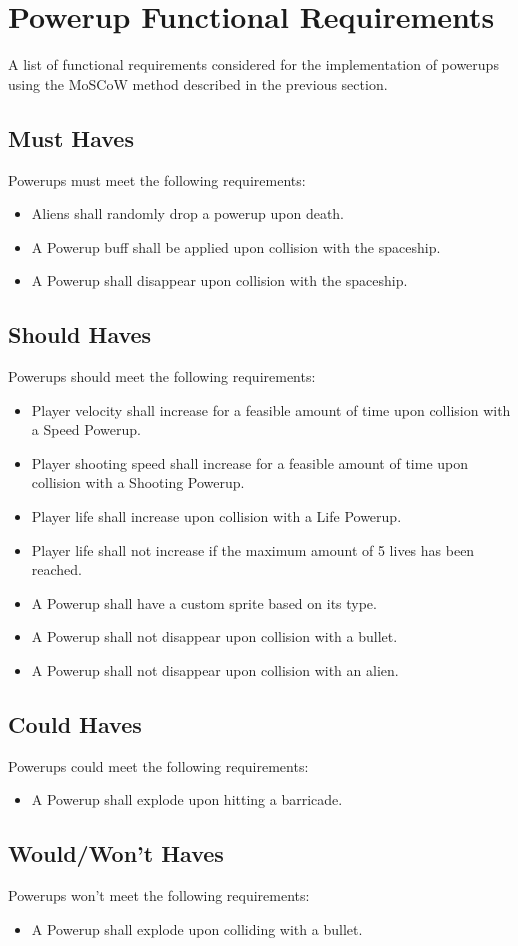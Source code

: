 \section{Powerup Functional Requirements}

A list of functional requirements considered for the implementation of powerups using the MoSCoW method described in the previous section.

\subsection{Must Haves}
Powerups must meet the following requirements:
\begin{itemize}
	\item Aliens shall randomly drop a powerup upon death.
	\item A Powerup buff shall be applied upon collision with the spaceship.
	\item A Powerup shall disappear upon collision with the spaceship.
\end{itemize}

\subsection{Should Haves}
Powerups should meet the following requirements:
\begin{itemize}
	\item Player velocity shall increase for a feasible amount of time upon collision with a Speed Powerup.
	\item Player shooting speed shall increase for a feasible amount of time upon collision with a Shooting Powerup.
	\item Player life shall increase upon collision with a Life Powerup.
	\item Player life shall not increase if the maximum amount of 5 lives has been reached.
	\item A Powerup shall have a custom sprite based on its type.
	\item A Powerup shall not disappear upon collision with a bullet.
	\item A Powerup shall not disappear upon collision with an alien.
\end{itemize}

\subsection{Could Haves}
Powerups could meet the following requirements:
\begin{itemize}
	\item A Powerup shall explode upon hitting a barricade.
\end{itemize}

\subsection{Would/Won't Haves}
Powerups won't meet the following requirements:
\begin{itemize}
	\item A Powerup shall explode upon colliding with a bullet.
\end{itemize}